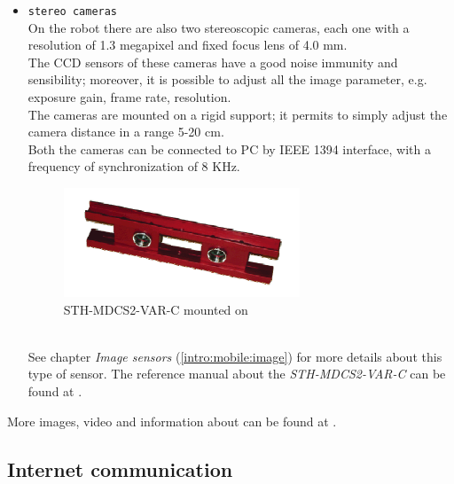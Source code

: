 \begin{itemize}
\item \texttt{stereo cameras} \\
  On the robot there are also two stereoscopic cameras, each one with a
  resolution of 1.3 megapixel and fixed focus lens of 4.0 mm. \\
  The CCD sensors of these cameras have a good noise immunity and
  sensibility; moreover, it is possible to adjust all the image parameter, e.g.
  exposure gain, frame rate, resolution. \\
  The cameras are mounted on a rigid support; it permits to simply adjust
  the camera distance in a range 5-20 cm. \\
  Both the cameras can be connected to PC by IEEE 1394 interface, with a
  frequency of synchronization of 8 KHz. \\
  \begin{figure}[h]
    \begin{center}
      \includegraphics[width=200pt]{img/camera_videre.png}
      \caption{STH-MDCS2-VAR-C mounted on \morduc{}}
      \label{fig:camera_videre}
    \end{center}
  \end{figure}
  \\
  See chapter \textit{Image sensors} (\ref{intro:mobile:image}) for more details
  about this type of sensor. The reference manual about the \textit{STH-MDCS2-VAR-C}
  can be found at \cite{3morduc:camera_sth_mdcs2}.

  

\end{itemize}

More images, video and information about \morduc{} can
be found at \cite{morduc:features}.


\subsection{Internet communication}
\label{intro:3morduc:communication}

